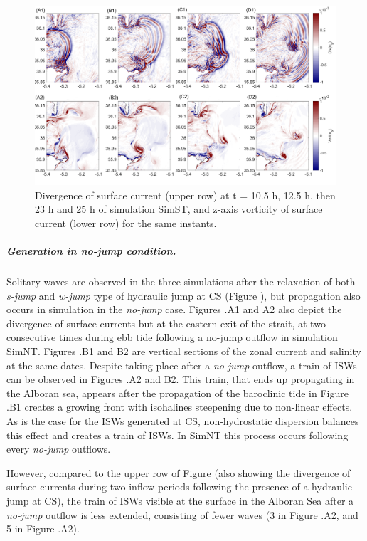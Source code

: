 \begin{figure}[!h]
 \centering
\includegraphics[width=\linewidth]{./GBR3D/FigTourbVE2.png}
 \caption [Divergence and vorticity of surface currents.]{Divergence of surface current (upper row) at t = 10.5 h, 12.5 h, then 23 h and 25 h of simulation SimST, and z-axis vorticity of surface current (lower row) for the same instants.}
 \label{FigeddGBR3D}
\end{figure}

\subparagraph{Generation in \textit{no-jump} condition.}
Solitary waves are observed in the three simulations after the relaxation of both \textit{s-jump} and \textit{w-jump} type of hydraulic jump at CS (Figure ), but propagation also occurs in simulation in the \textit{no-jump} case. Figures .A1 and A2 also depict the divergence of surface currents but at the eastern exit of the strait, at two consecutive times during ebb tide following a no-jump outflow in simulation SimNT. Figures .B1 and B2 are vertical sections of the zonal current and salinity at the same dates. Despite taking place after a \textit{no-jump} outflow, a train of ISWs can be observed in Figures .A2 and B2. This train, that ends up propagating in the Alboran sea, appears after the propagation of the baroclinic tide in Figure .B1 creates a growing front with isohalines steepening due to non-linear effects. As is the case for the ISWs generated at CS, non-hydrostatic dispersion balances this effect and creates a train of ISWs. In SimNT this process occurs following every \textit{no-jump} outflows.

However, compared to the upper row of Figure  (also showing the divergence of surface currents during two inflow periods following the presence of a hydraulic jump at CS), the train of ISWs visible at the surface in the Alboran Sea after a \textit{no-jump} outflow is less extended, consisting of fewer waves (3 in Figure .A2, and 5 in Figure .A2).

